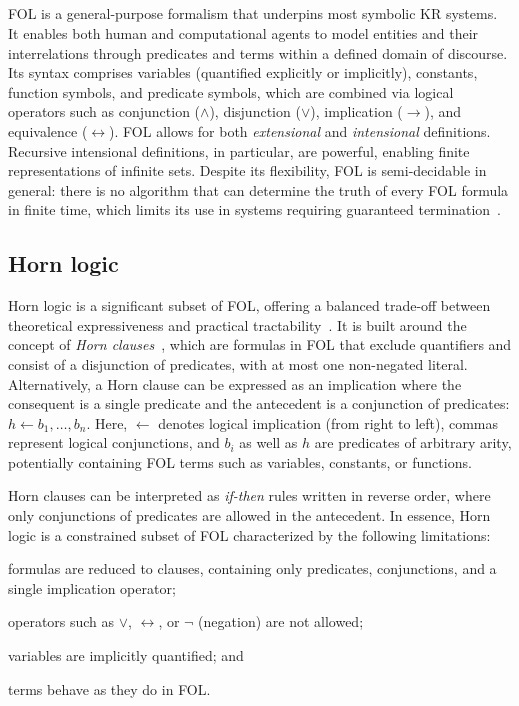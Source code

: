 \subsection{}\label{subsec:first-order-logic}
%
\Gls{FOL} is a general-purpose formalism that underpins most symbolic \gls{KR} systems.
%
It enables both human and computational agents to model entities and their interrelations through predicates and terms within a defined domain of discourse.
%
Its syntax comprises variables (quantified explicitly or implicitly), constants, function symbols, and predicate symbols, which are combined via logical operators such as conjunction (\(\wedge\)), disjunction (\(\vee\)), implication (\(\rightarrow\)), and equivalence (\(\leftrightarrow\)).
%
\Gls{FOL} allows for both \emph{extensional} and \emph{intensional} definitions.
%
Recursive intensional definitions, in particular, are powerful, enabling finite representations of infinite sets.
%
Despite its flexibility, \gls{FOL} is semi-decidable in general: there is no algorithm that can determine the truth of every \gls{FOL} formula in finite time, which limits its use in systems requiring guaranteed termination~\cite{DBLP:conf/dlog/2003handbook}.


\subsection{Horn logic}\label{subsec:horn-logic}
%
Horn logic is a significant subset of \gls{FOL}, offering a balanced trade-off between theoretical expressiveness and practical tractability~\cite{DBLP:journals/jcss/Makowsky87}.
%
It is built around the concept of \emph{Horn clauses}~\cite{DBLP:journals/jsyml/Horn51}, which are formulas in \gls{FOL} that exclude quantifiers and consist of a disjunction of predicates, with at most one non-negated literal.
%
Alternatively, a Horn clause can be expressed as an implication where the consequent is a single predicate and the antecedent is a conjunction of predicates: \(h \gets b_1, \dots, b_n\).
%
Here, \(\gets\) denotes logical implication (from right to left), commas represent logical conjunctions, and \(b_i\) as well as \(h\) are predicates of arbitrary arity, potentially containing \gls{FOL} terms such as variables, constants, or functions.

Horn clauses can be interpreted as \emph{if-then} rules written in reverse order, where only conjunctions of predicates are allowed in the antecedent.
%
In essence, Horn logic is a constrained subset of \gls{FOL} characterized by the following limitations:
%
\begin{inlinelist}
%
    \item formulas are reduced to clauses, containing only predicates, conjunctions, and a single implication operator;
    \item operators such as \(\lor\), \(\leftrightarrow\), or \(\neg\) (negation) are not allowed;
    \item variables are implicitly quantified; and
    \item terms behave as they do in \gls{FOL}.
\end{inlinelist}


